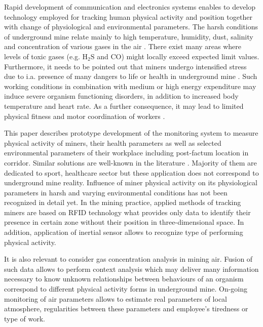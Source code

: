\documentclass[10pt, a4paper]{article}
\begin{document}
Rapid development of communication and electronics systems enables to develop technology employed for tracking human physical activity and position together with change of physiological and environmental parameters. The harsh conditions of underground mine relate mainly to high temperature, humidity, dust, salinity and concentration of various gases in the air \cite{bascomptadetermination,hartman2012mine}. There exist many areas where levels of toxic gases (e.g. $\mathrm{H_2S}$ and CO) might locally exceed expected limit values. Furthermore, it needs to be pointed out that miners undergo intensified stress due to i.a. presence of many dangers to life or health in underground mine \cite{ryan2017heat}. Such working conditions in combination with medium or high energy expenditure may induce severe organism functioning disorders, in addition to increased body temperature and heart rate. As a further consequence, it may lead to limited physical fitness and motor coordination of workers \cite{dosinas2006measurement}.

This paper describes prototype development of the monitoring system to measure physical activity of miners, their health parameters as well as selected environmental parameters of their workplace including post-factum location in corridor. Similar solutions are well-known in the literature \cite{shaffer1992position,hol2007robust,sabatini2011estimating,aggarwal2011human,dosinas2006measurement,paiyarom2009activity,pantelopoulos2010survey}. Majority of them are dedicated to sport, healthcare sector but these application does not correspond to underground mine reality. Influence of miner physical activity on its physiological parameters in harsh and varying environmental conditions has not been recognized in detail yet. In the mining practice, applied methods of tracking miners are based on RFID technology what provides only data to identify their presence in certain zone without their position in three-dimensional space. In addition, application of inertial sensor allows to recognize type of performing physical activity.

It is also relevant to consider gas concentration analysis in mining air. Fusion of such data allows to perform context analysis which may deliver many information necessary to know unknown relationships between behaviours of an organism correspond to different physical activity forms in underground mine. On-going monitoring of air parameters allows to estimate real parameters of local atmosphere, regularities between these parameters and employee's tiredness or type of work.
\end{document}
